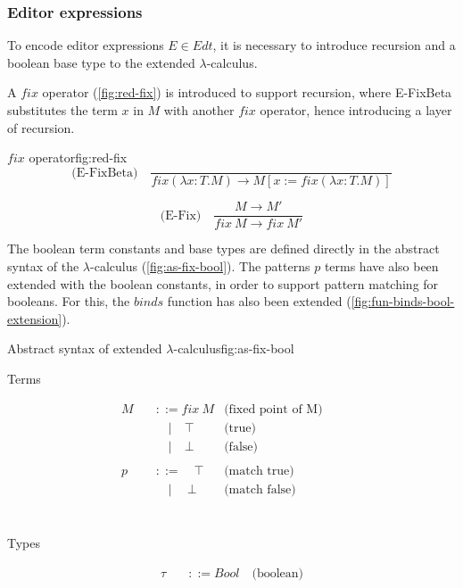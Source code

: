 \subsubsection{Editor expressions}
To encode editor expressions $E \in Edt$, it is necessary to introduce recursion and a boolean base type to the extended $\lambda$-calculus.

A $fix$ operator (\cref{fig:red-fix}) is introduced to support recursion, where E-FixBeta substitutes the term $x$ in $M$ with another $fix$ operator, hence introducing a layer of recursion.

\begin{myfigure}{$fix$ operator}{fig:red-fix}
    \[
        \text{(E-FixBeta)} \quad \frac{}{fix(\lambda x : T.M) \rightarrow M[x := fix(\lambda x : T.M)]}
    \]

    \[
        \text{(E-Fix)} \quad \frac{M \rightarrow M'}{fix \ M \rightarrow fix \ M'}
    \]
\end{myfigure}


The boolean term constants and base types are defined directly in the abstract syntax of the $\lambda$-calculus (\cref{fig:as-fix-bool}). The patterns $p$ terms have also been extended with the boolean constants, in order to support pattern matching for booleans. For this, the $binds$ function has also been extended (\cref{fig:fun-binds-bool-extension}).

\begin{myfigure}{Abstract syntax of extended $\lambda$-calculus}{fig:as-fix-bool}
    \begin{center}
        Terms
    \end{center}
    \[
        \begin{aligned}
            M \quad & ::= fix \ M          & \text{(fixed point of M)} &  & \\
                    & \quad | \quad \top   & \text{(true)}             &  & \\
                    & \quad | \quad \bot   & \text{(false)}            &  & \\
            \\
            p \quad & ::= \quad \top       & \text{(match true)}       &  & \\
                    & \quad | \quad \ \bot & \text{(match false)}      &  & \\
        \end{aligned}
    \]
    \\
    \begin{center}
        Types
    \end{center}
    \[
        \begin{aligned}
            \tau \quad & ::= Bool \quad \text{(boolean)}
        \end{aligned}
    \]
\end{myfigure}

